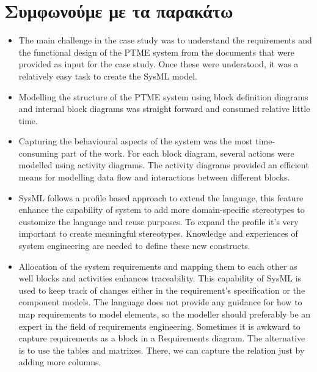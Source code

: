 \documentclass[a4paper,12pt,twoside]{report}
\begin{document}
		\section{Συμφωνούμε με τα παρακάτω}
			\begin{itemize}
				\item The main challenge in the case study was to understand the requirements and the functional design of the PTME system from the documents that were provided as input for the case study. Once these were understood, it was a relatively easy task to create the SysML model. \cite{SMSpacecraft}
				\item Modelling the structure of the PTME system using block definition diagrams and internal block diagrams was straight forward and consumed relative little time. \cite{SMSpacecraft}
				\item Capturing the behavioural aspects of the system was the most time-consuming part of the work. For each block diagram, several actions were modelled using activity diagrams. The activity diagrams provided an efficient means for modelling data flow and interactions between different blocks.  \cite{SMSpacecraft}
				\item  SysML follows a profile based approach to extend the language, this feature enhance the capability of system to add more domain-specific stereotypes to customize the language and reuse purposes. To expand the profile it’s very important to create meaningful stereotypes. Knowledge and experiences of system engineering are needed to define these new constructs. \cite{SMSpacecraft}
				\item Allocation of the system requirements and mapping them to each other as well blocks and activities enhances traceability. This capability of SysML is used to keep track of changes either in the requirement’s specification or the component models. The language does not provide any guidance for how to map requirements to model elements, so the modeller should preferably be an expert in the field of requirements engineering. Sometimes it is awkward to capture requirements as a block in a Requirements diagram. The alternative is to use the tables and matrixes. There, we can capture the relation just by adding more columns. \cite{SMSpacecraft}

\end{itemize}
\end{document}
